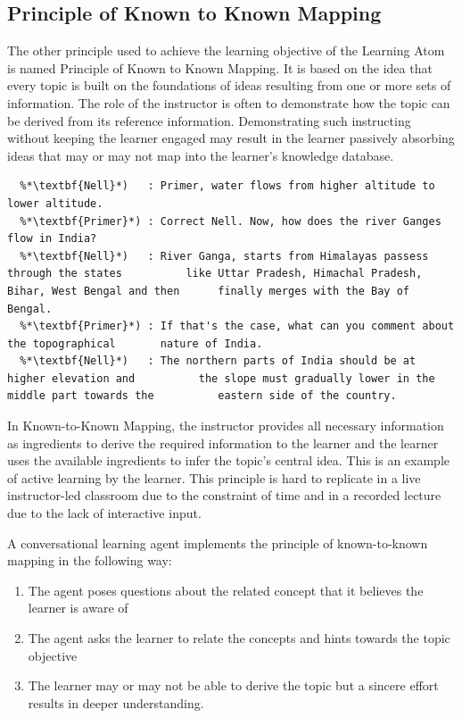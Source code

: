 \documentclass[]{article}
\begin{document}
\subsection[Known-to-Known]{Principle of Known to Known Mapping}


The other principle used to achieve the learning objective of the Learning Atom is named Principle of Known to Known Mapping. It is based on the idea that every topic is built on the foundations of ideas resulting from one or more sets of information. The role of the instructor is often to demonstrate how the topic can be derived from its reference information. Demonstrating such instructing without keeping the learner engaged may result in the learner passively absorbing ideas that may or may not map into the learner's knowledge database. 

\begin{lstlisting}[frame=single,caption=Learning Atom using the principle of Known to Known Mapping,float,label=list5]
  %*\textbf{Primer}*) : Nell, how does the water flow?
  %*\textbf{Nell}*)   : Primer, water flows from higher altitude to lower altitude.
  %*\textbf{Primer}*) : Correct Nell. Now, how does the river Ganges flow in India?
  %*\textbf{Nell}*)   : River Ganga, starts from Himalayas passess through the states          like Uttar Pradesh, Himachal Pradesh, Bihar, West Bengal and then      finally merges with the Bay of Bengal.
  %*\textbf{Primer}*) : If that's the case, what can you comment about the topographical       nature of India.
  %*\textbf{Nell}*)   : The northern parts of India should be at higher elevation and          the slope must gradually lower in the middle part towards the          eastern side of the country.
  \end{lstlisting}
 

In Known-to-Known Mapping, the instructor provides all necessary information as ingredients to derive the required information to the learner and the learner uses the available ingredients to infer the topic's central idea. This is an example of active learning by the learner. This principle is hard to replicate in a live instructor-led classroom due to the constraint of time and in a recorded lecture due to the lack of interactive input. 

A conversational learning agent implements the principle of known-to-known mapping in the following way:
\begin{enumerate}
  
  \item The agent poses questions about the related concept that it believes the learner is aware of
  \item The agent asks the learner to relate the concepts and hints towards the topic objective 
  \item The learner may or may not be able to derive the topic but a sincere effort results in deeper understanding.
  
\end{enumerate}
\end{document}
